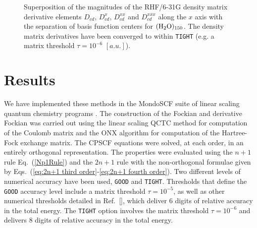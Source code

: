 \documentclass[prl,aps,preprint,showpacs,superbib]{revtex4}
\begin{document}
{\begin{figure}[t]
  \caption{\protect
    Superposition of the magnitudes of the RHF/6-31G density matrix
    derivative elements $D_{cd}$, $D^{x}_{cd}$, $D^{xx}_{cd}$ and $D^{xxx}_{cd}$
    along the $x$ axis with the separation of basis function centers
    for $\rm (H_2O)_{150}$. The density matrix 
    derivatives have been converged to within {\tt TIGHT} (e.g. 
    a matrix threshold $\tau=10^{-6}$ $[a.u.]$).
  }\label{fig:Superposition_Decay}
\end{figure}

}

\section{Results} \label{RESULTS}

We have implemented these methods in the MondoSCF suite of linear scaling quantum chemistry 
programs \cite{MondoSCF}.  The construction of the Fockian and derivative Fockian was carried
out using the linear scaling QCTC method for computation of the Coulomb matrix \cite{MChallacombe97,CTymczak04a} and the
ONX algorithm \cite{ESchwegler97,CTymczak04b} for computation of the Hartree-Fock exchange matrix. 
The CPSCF equations were solved, at each order, in an entirely orthogonal representation.
The properties were evaluated using the $n+1$ rule Eq.~(\ref{Np1Rule}) and the $2n+1$ rule with 
the non-orthogonal formulae given by Eqs.~(\ref{eq:2n+1 third order}-\ref{eq:2n+1 fourth order}).
Two different levels of numerical 
accuracy have been used, {\tt GOOD} and {\tt TIGHT}.   Thresholds that define the {\tt GOOD} 
accuracy level include a matrix threshold $\tau=10^{-5}$, as well as other numerical thresholds 
detailed in Ref.~[], which deliver 6 digits of relative accuracy in the total 
energy.  The {\tt TIGHT} option involves the matrix threshold $\tau=10^{-6}$ and delivers 8 
digits of relative accuracy in the total energy.  
\end{document}
